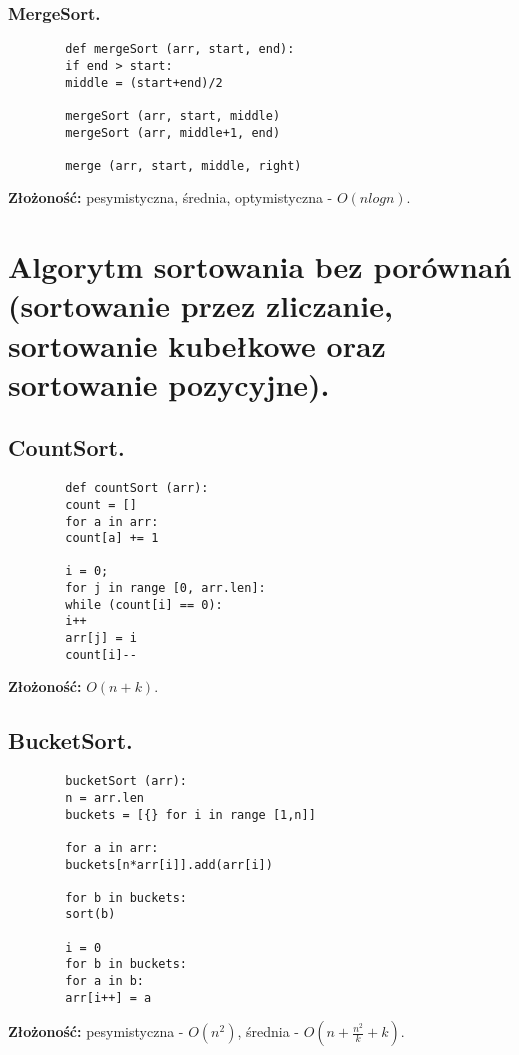 \documentclass[main.tex]{subfiles}
\begin{document}
    \subsubsection{MergeSort.}

    \begin{verbatim}
        def mergeSort (arr, start, end):
        if end > start:
        middle = (start+end)/2

        mergeSort (arr, start, middle)
        mergeSort (arr, middle+1, end)

        merge (arr, start, middle, right)
    \end{verbatim}
    \textbf{Złożoność:} pesymistyczna, średnia, optymistyczna - $O(nlogn)$.

    \newpage

    \section{Algorytm sortowania bez porównań (sortowanie przez zliczanie, sortowanie kubełkowe oraz sortowanie pozycyjne).}

    \subsection{CountSort.}
    \begin{verbatim}
        def countSort (arr):
        count = []
        for a in arr:
        count[a] += 1

        i = 0;
        for j in range [0, arr.len]:
        while (count[i] == 0):
        i++
        arr[j] = i
        count[i]--
    \end{verbatim}
    \textbf{Złożoność:} $O(n+k)$.

    \subsection{BucketSort.}
    \begin{verbatim}
        bucketSort (arr):
        n = arr.len
        buckets = [{} for i in range [1,n]]

        for a in arr:
        buckets[n*arr[i]].add(arr[i])

        for b in buckets:
        sort(b)

        i = 0
        for b in buckets:
        for a in b:
        arr[i++] = a
    \end{verbatim}
    \textbf{Złożoność:} pesymistyczna -  $O(n^2)$, średnia - $O\left(n + \frac{n^2}{k} + k\right)$.
\end{document}
